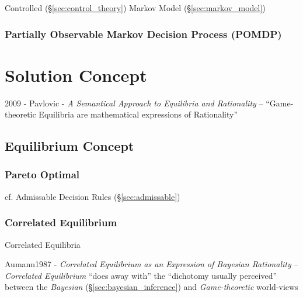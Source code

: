 Controlled (\S\ref{sec:control_theory}) Markov Model (\S\ref{sec:markov_model})



\subsubsection{Partially Observable Markov Decision Process (POMDP)}
\label{sec:pomdp}



\section{Solution Concept}\label{sec:solution_concept}

2009 - Pavlovic - \emph{A Semantical Approach to Equilibria and Rationality} --
``Game-theoretic Equilibria are mathematical expressions of Rationality''



\subsection{Equilibrium Concept}\label{sec:equilibrium_concept}

\subsubsection{Pareto Optimal}\label{sec:pareto_optimal}

\fist cf. Admissable Decision Rules (\S\ref{sec:admissable})



\subsubsection{Correlated Equilibrium}\label{sec:correlated_equilibrium}

Correlated Equilibria

Aumann1987 - \emph{Correlated Equilibrium as an Expression of Bayesian
  Rationality} -- \emph{Correlated Equilibrium} ``does away with'' the
``dichotomy usually perceived'' between the \emph{Bayesian}
(\S\ref{sec:bayesian_inference}) and \emph{Game-theoretic} world-views



